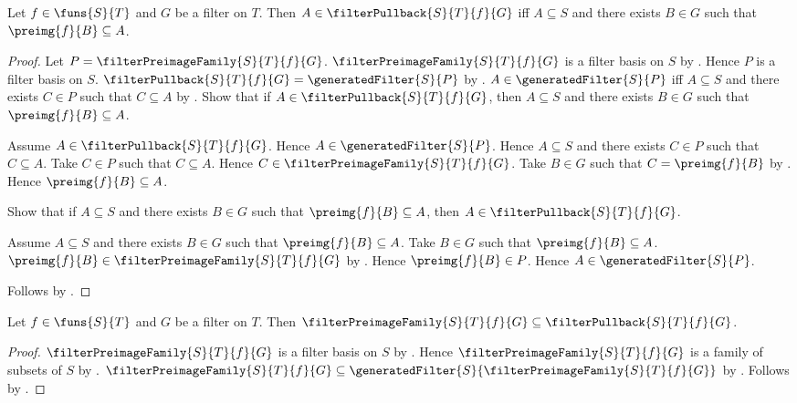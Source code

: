 \begin{theorem}\label{filter_pullback_iff}
    Let $f\in\funs{S}{T}$ and $G$ be a filter on $T$.
    Then $A\in\filterPullback{S}{T}{f}{G}$ iff
        $A\subseteq S$ and there exists $B\in G$ such that
        $\preimg{f}{B}\subseteq A$.
\end{theorem}
\begin{proof}
    Let $P=\filterPreimageFamily{S}{T}{f}{G}$.
    $\filterPreimageFamily{S}{T}{f}{G}$ is a filter basis on $S$ by
        .
    Hence $P$ is a filter basis on $S$.
    $\filterPullback{S}{T}{f}{G}
        =\generatedFilter{S}{P}$ by
        .
    $A\in\generatedFilter{S}{P}$ iff
        $A\subseteq S$ and there exists $C\in P$ such that $C\subseteq A$
        by .
    Show that if $A\in\filterPullback{S}{T}{f}{G}$, then
        $A\subseteq S$ and there exists $B\in G$ such that
        $\preimg{f}{B}\subseteq A$.
    \begin{subproof}
        Assume $A\in\filterPullback{S}{T}{f}{G}$.
        Hence $A\in\generatedFilter{S}{P}$.
        Hence $A\subseteq S$ and there exists
            $C\in P$ such that $C\subseteq A$.
        Take $C\in P$ such that $C\subseteq A$.
        Hence $C\in\filterPreimageFamily{S}{T}{f}{G}$.
        Take $B\in G$ such that $C=\preimg{f}{B}$ by
            .
        Hence $\preimg{f}{B}\subseteq A$.
    \end{subproof}
    Show that if $A\subseteq S$ and there exists $B\in G$ such that
        $\preimg{f}{B}\subseteq A$, then
        $A\in\filterPullback{S}{T}{f}{G}$.
    \begin{subproof}
        Assume $A\subseteq S$ and there exists $B\in G$ such that
            $\preimg{f}{B}\subseteq A$.
        Take $B\in G$ such that $\preimg{f}{B}\subseteq A$.
        $\preimg{f}{B}\in\filterPreimageFamily{S}{T}{f}{G}$ by
            .
        Hence $\preimg{f}{B}\in P$.
        Hence $A\in\generatedFilter{S}{P}$.
    \end{subproof}
    Follows by \auto.
\end{proof}

\begin{proposition}\label{preimage_family_contained_in_pullback}
    Let $f\in\funs{S}{T}$ and $G$ be a filter on $T$.
    Then $\filterPreimageFamily{S}{T}{f}{G}
        \subseteq\filterPullback{S}{T}{f}{G}$.
\end{proposition}
\begin{proof}
    $\filterPreimageFamily{S}{T}{f}{G}$ is a filter basis on $S$ by
        .
    Hence $\filterPreimageFamily{S}{T}{f}{G}$ is a family of subsets of
        $S$ by .
    $\filterPreimageFamily{S}{T}{f}{G}\subseteq
        \generatedFilter{S}{\filterPreimageFamily{S}{T}{f}{G}}$ by
        .
    Follows by .
\end{proof}

